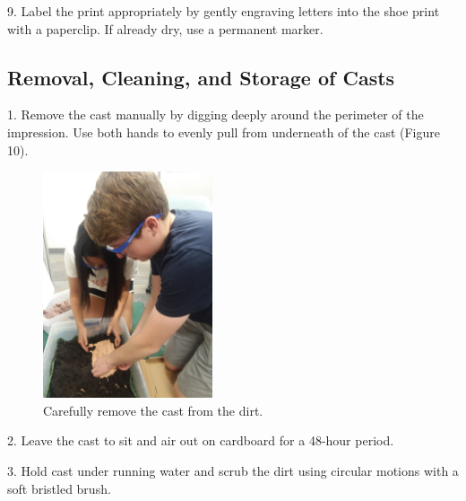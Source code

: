 9. Label the print appropriately by gently engraving letters into the shoe print with a paperclip. If already dry, use a permanent marker.

\subsection{Removal, Cleaning, and Storage of Casts}

1. Remove the cast manually by digging deeply around the perimeter of the impression. Use both hands to evenly pull from underneath of the cast (Figure 10).

\begin{figure}[!htp]
\centering
\includegraphics[width=5cm]{Cast_done}
\caption{Carefully remove the cast from the dirt. }
\label{Image 10}
\end{figure}

2. Leave the cast to sit and air out on cardboard for a 48-hour period.

3. Hold cast under running water and scrub the dirt using circular motions with a soft bristled brush.





